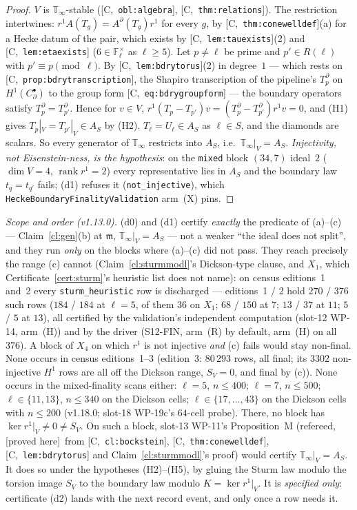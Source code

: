 \documentclass[11pt]{article}
\theoremstyle{remark}
\newcommand{\F}{\mathbb{F}}
\newcommand{\Fl}{\F_\ell}
\DeclareMathOperator{\rank}{rank}
\newcommand{\T}{\mathbb{T}}
\newcommand{\m}{\mathfrak{m}}
\newcommand{\HA}[1]{[C,~\texttt{#1}]}      %
\newcommand{\PROVED}{\textsf{[proved here]}}
\begin{document}
\begin{proof}
$V$ is $\T_\infty$-stable (\HA{obl:algebra}, \HA{thm:relations}). The restriction intertwines:
$r^1A(T_g)=A^{\partial}(T_g)r^1$ for every $g$, by \HA{thm:conewelldef}(a) for a Hecke datum of the pair,
which exists by \HA{lem:tauexists}(2) and \HA{lem:etaexists} ($6\in\Fl^{\times}$ as $\ell\ge5$). Let
$p\ne\ell$ be prime and $p'\in R(\ell)$ with $p'\equiv p\pmod\ell$. By \HA{lem:bdrytorus}(2) in degree~$1$
--- which rests on \HA{prop:bdrytranscription}, the Shapiro transcription of the pipeline's
$T^{\partial}_p$ on $H^1(C^{\bullet}_{\partial})$ to the group form \HA{eq:bdrygroupform} --- the boundary
operators satisfy $T^{\partial}_{p}=T^{\partial}_{p'}$. Hence for $v\in V$,
$r^1(T_p-T_{p'})v=(T^{\partial}_p-T^{\partial}_{p'})r^1v=0$, and (H1) gives $T_p|_V=T_{p'}|_V\in A_S$ by (H2).
$T_\ell=U_\ell\in A_S$ as $\ell\in S$, and the diamonds are scalars. So every generator of $\T_\infty$
restricts into $A_S$, i.e.\ $\T_\infty|_V=A_S$. \emph{Injectivity, not Eisenstein-ness, is the
hypothesis}: on the \texttt{mixed} block $(34,7)$ ideal~$2$ ($\dim V=4$, $\rank r^1=2$) every
representative lies in $A_S$ and the boundary law $t_q=t_{q'}$ fails; (d1) refuses it
(\texttt{not\_injective}), which \texttt{HeckeBoundaryFinalityValidation} arm~(X) pins.
\end{proof}

\noindent\emph{Scope and order (v1.13.0).} (d0) and (d1) certify \emph{exactly} the predicate of
(a)--(c) --- Claim~\ref{cl:gen}(b) at $\m$, $\T_\infty|_V=A_S$ --- not a weaker ``the ideal does not
split'', and they run \emph{only} on the blocks where (a)--(c) did not pass. They reach precisely the
range (c) cannot (Claim~\ref{cl:sturmmodl}'s Dickson-type clause, and $X_1$, which
Certificate~\ref{cert:sturm}'s heuristic list does not name): on census editions~1 and~2 every
\texttt{sturm\_heuristic} row is discharged --- editions~1 / 2 hold $270$ / $376$ such rows
($184$ / $184$ at $\ell=5$, of them $36$ on $X_1$; $68$ / $150$ at $7$; $13$ / $37$ at $11$; $5$ / $5$ at
$13$), all certified by the validation's independent computation (slot-12 WP-14, arm~(H)) and by the
driver (S12-FIN, arm~(R) by default, arm~(H) on all $376$). A block of $X_4$ on which $r^1$ is not injective \emph{and} (c) fails would stay non-final. None occurs in census
editions~1--3 (edition~3: $80\,293$ rows, all final; its $3302$ non-injective $H^1$ rows are all off the Dickson
range, $S_V=0$, and final by (c)). None occurs in the mixed-finality scans either: $\ell=5$, $n\le400$; $\ell=7$,
$n\le500$; $\ell\in\{11,13\}$, $n\le340$ on the Dickson cells; $\ell\in\{17,\dots,43\}$ on the Dickson cells with
$n\le200$ (v1.18.0; slot-18 WP-19c's $64$-cell probe). There, no block has $\ker r^1|_V\ne0\ne S_V$. On such a block, slot-13 WP-11's Proposition~M (refereed,
\PROVED\ from \HA{cl:bockstein}, \HA{thm:conewelldef}, \HA{lem:bdrytorus} and Claim~\ref{cl:sturmmodl}'s proof)
would certify $\T_\infty|_V=A_S$. It does so under the hypotheses (H2)--(H5), by gluing the Sturm law modulo the
torsion image $S_V$ to the boundary law modulo $K=\ker r^1|_V$. It is \emph{specified only}: certificate (d2) lands
with the next record event, and only once a row needs it.
\end{document}

